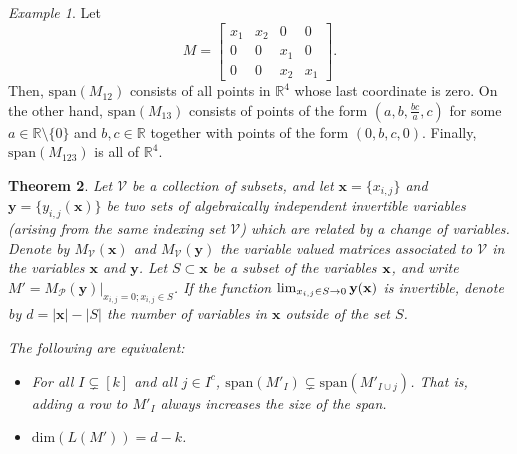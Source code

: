\documentclass[11pt]{article}
\newcommand{\R}{\mathbb{R}}
\newcommand{\Gr}{\mathbb{G}_{\R, \geq 0}}
\newcommand{\cV}{\mathcal{V}}
\newtheorem{thm}{Theorem}[section]
\theoremstyle{remark}
\newtheorem{eg}[thm]{Example}
\theoremstyle{definition}
\begin{document}
\begin{appendices}
\begin{eg}
Let
%
\begin{displaymath}
M =
\begin{bmatrix}x_1 & x_2 & 0 & 0 \\
0 & 0 & x_1 & 0 \\
0 & 0 & x_2 & x_1 \end{bmatrix}.
\end{displaymath}
\noindent
Then, $\mathrm{span}(M_{12})$ consists of all points in $\mathbb{R}^4$ whose last coordinate is zero. On the other hand, $\mathrm{span}(M_{13})$ consists of points of the form $(a,b,\frac{bc}{a},c)$ for some $a \in \mathbb{R} \setminus \{0\}$ and $b, c \in \mathbb{R}$ together with points of the form $(0,b,c,0)$. Finally, $\mathrm{span}(M_{123})$ is all of $\mathbb{R}^4$.
\end{eg}

\begin{thm}\label{res:Rado} 
Let $\cV$ be a collection of subsets, and let $\mathbf{x} = \{x_{i,j}\}$ and $\mathbf{y} = \{y_{i,j}(\mathbf{x})\}$ be two sets of algebraically independent invertible variables (arising from the same indexing set $\cV$) which are related by a change of variables. Denote by $M_{\cV}(\mathbf{x})$ and $M_{\cV}(\mathbf{y})$ the variable valued matrices associated to $\cV$ in the variables $\mathbf{x}$ and $\mathbf{y}$. Let $S \subset \mathbf{x}$ be a subset of the variables $\bf{x}$, and write $M' = M_{\mathcal{P}}(\mathbf{y})|_{x_{i,j} = 0; x_{i,j} \in S}$. If the function $\lim_{x_{i,j} \in S \to 0} \bf{y}(\bf{x})$ is invertible, denote by $d = |\mathbf{x}| - |S|$ the number of variables in $\mathbf{x}$ outside of the set $S$. %

The following are equivalent: 
\begin{itemize}
\item[(i)] For all $I \subsetneq [k]$ and all $j \in I^c$, $\mathrm{span}(M'_I) \subsetneq \mathrm{span}(M'_{I \cup j})$. That is, adding a row to $M'_I$ always increases the size of the span.
\item[(ii)] $\mathrm{dim}(L(M')) = d-k$.
\end{itemize}
\end{thm}


\end{appendices}
\end{document}
